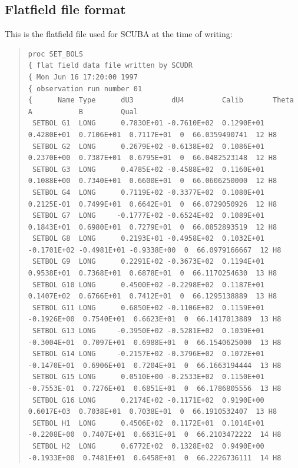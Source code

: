 \documentclass[twoside,11pt]{article}
\newenvironment{myquote}{\begin{quote}\begin{small}}{\end{small}\end{quote}}
\renewcommand{\_}{\texttt{\symbol{95}}}
\begin{document}
\begin{landscape}
\section{Flatfield file format\label{app:ff}}

This is the flatfield file used for SCUBA at the time of writing:


\begin{myquote}
\begin{verbatim}
proc SET_BOLS
{ flat field data file written by SCUDR
{ Mon Jun 16 17:20:00 1997
{ observation run number 01
{      Name Type      dU3         dU4         Calib       Theta       A           B         Qual
 SETBOL G1  LONG      0.7830E+01 -0.7610E+02  0.1290E+01  0.4280E+01  0.7106E+01  0.7117E+01  0  66.0359490741  12 H8         
 SETBOL G2  LONG      0.2679E+02 -0.6138E+02  0.1086E+01  0.2370E+00  0.7387E+01  0.6795E+01  0  66.0482523148  12 H8         
 SETBOL G3  LONG      0.4785E+02 -0.4588E+02  0.1160E+01  0.1088E+00  0.7340E+01  0.6600E+01  0  66.0606250000  12 H8         
 SETBOL G4  LONG      0.7119E+02 -0.3377E+02  0.1080E+01  0.2125E-01  0.7499E+01  0.6642E+01  0  66.0729050926  12 H8         
 SETBOL G7  LONG     -0.1777E+02 -0.6524E+02  0.1089E+01  0.1843E+01  0.6980E+01  0.7279E+01  0  66.0852893519  12 H8         
 SETBOL G8  LONG      0.2193E+01 -0.4958E+02  0.1032E+01 -0.1701E+02 -0.4981E+01 -0.9338E+00  0  66.0979166667  12 H8         
 SETBOL G9  LONG      0.2291E+02 -0.3673E+02  0.1194E+01  0.9538E+01  0.7368E+01  0.6878E+01  0  66.1170254630  13 H8         
 SETBOL G10 LONG      0.4500E+02 -0.2298E+02  0.1187E+01  0.1407E+02  0.6766E+01  0.7412E+01  0  66.1295138889  13 H8         
 SETBOL G11 LONG      0.6850E+02 -0.1106E+02  0.1159E+01 -0.1926E+00  0.7540E+01  0.6623E+01  0  66.1417013889  13 H8         
 SETBOL G13 LONG     -0.3950E+02 -0.5281E+02  0.1039E+01 -0.3004E+01  0.7097E+01  0.6988E+01  0  66.1540625000  13 H8         
 SETBOL G14 LONG     -0.2157E+02 -0.3796E+02  0.1072E+01 -0.1470E+01  0.6906E+01  0.7204E+01  0  66.1663194444  13 H8         
 SETBOL G15 LONG      0.0510E+00 -0.2533E+02  0.1150E+01 -0.7553E-01  0.7276E+01  0.6851E+01  0  66.1786805556  13 H8         
 SETBOL G16 LONG      0.2174E+02 -0.1171E+02  0.9190E+00  0.6017E+03  0.7038E+01  0.7038E+01  0  66.1910532407  13 H8         
 SETBOL H1  LONG      0.4506E+02  0.1172E+01  0.1014E+01 -0.2208E+00  0.7407E+01  0.6631E+01  0  66.2103472222  14 H8         
 SETBOL H2  LONG      0.6772E+02  0.1328E+02  0.9490E+00 -0.1933E+00  0.7481E+01  0.6458E+01  0  66.2226736111  14 H8         

\end{verbatim}
\end{myquote}
\end{landscape}
\end{document}
